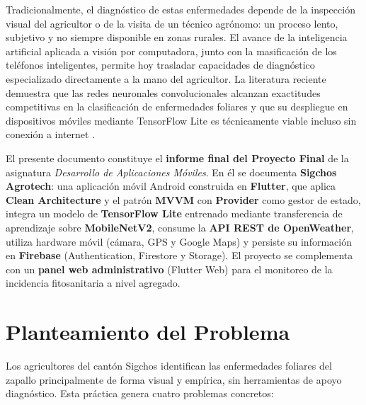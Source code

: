 \documentclass[12pt,a4paper]{article}
\begin{document}
Tradicionalmente, el diagnóstico de estas enfermedades depende de la inspección
visual del agricultor o de la visita de un técnico agrónomo: un proceso lento,
subjetivo y no siempre disponible en zonas rurales. El avance de la inteligencia
artificial aplicada a visión por computadora, junto con la masificación de los
teléfonos inteligentes, permite hoy trasladar capacidades de diagnóstico
especializado directamente a la mano del agricultor. La literatura reciente
demuestra que las redes neuronales convolucionales alcanzan exactitudes
competitivas en la clasificación de enfermedades foliares
\cite{cnn2021transfer, pumpkin2024} y que su despliegue en dispositivos móviles
mediante TensorFlow Lite es técnicamente viable incluso sin conexión a internet
\cite{applemobile2024, maizemobile2023}.

El presente documento constituye el \textbf{informe final del Proyecto Final} de
la asignatura \textit{Desarrollo de Aplicaciones Móviles}. En él se documenta
\textbf{Sigchos Agrotech}: una aplicación móvil Android construida en
\textbf{Flutter}, que aplica \textbf{Clean Architecture} y el patrón
\textbf{MVVM} con \textbf{Provider} como gestor de estado, integra un modelo de
\textbf{TensorFlow Lite} entrenado mediante transferencia de aprendizaje sobre
\textbf{MobileNetV2}, consume la \textbf{API REST de OpenWeather}, utiliza
hardware móvil (cámara, GPS y Google Maps) y persiste su información en
\textbf{Firebase} (Authentication, Firestore y Storage). El proyecto se
complementa con un \textbf{panel web administrativo} (Flutter Web) para el
monitoreo de la incidencia fitosanitaria a nivel agregado.

\section{Planteamiento del Problema}

Los agricultores del cantón Sigchos identifican las enfermedades foliares del
zapallo principalmente de forma visual y empírica, sin herramientas de apoyo
diagnóstico. Esta práctica genera cuatro problemas concretos:
\end{document}
